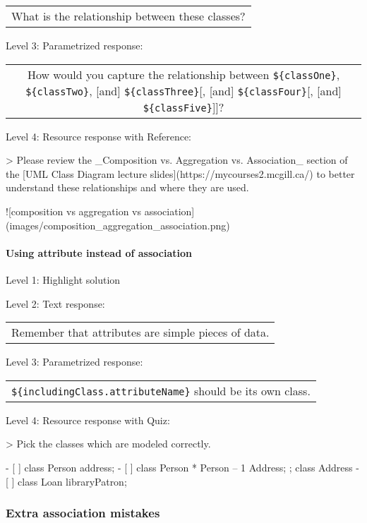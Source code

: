\begin{tabular}{|c}
What is the relationship between these classes?
\end{tabular} \medskip

\noindent Level 3: Parametrized response: \medskip

\begin{tabular}{|c}
How would you capture the relationship between \verb|${classOne}|, \verb|${classTwo}|, [and] \verb|${classThree}|[, [and] \verb|${classFour}|[, [and] \verb|${classFive}|]]?
\end{tabular} \medskip

\noindent Level 4: Resource response with Reference:

> Please review the _Composition vs. Aggregation vs. Association_ section of 
the [UML Class Diagram lecture slides](https://mycourses2.mcgill.ca/) to 
better understand these relationships and where they are used.

![composition vs aggregation vs association](images/composition_aggregation_association.png)


\paragraph{Using attribute instead of association}

\noindent Level 1: Highlight solution \medskip

\noindent Level 2: Text response: \medskip

\begin{tabular}{|c}
Remember that attributes are simple pieces of data.
\end{tabular} \medskip

\noindent Level 3: Parametrized response: \medskip

\begin{tabular}{|c}
\verb|${includingClass.attributeName}| should be its own class.
\end{tabular} \medskip

\noindent Level 4: Resource response with Quiz:

> Pick the classes which are modeled correctly.

- [ ] class Person { address; }
- [ ] class Person { * Person -- 1 Address; }; class Address {}
- [ ] class Loan { libraryPatron; }


\subsubsection{Extra association mistakes}

